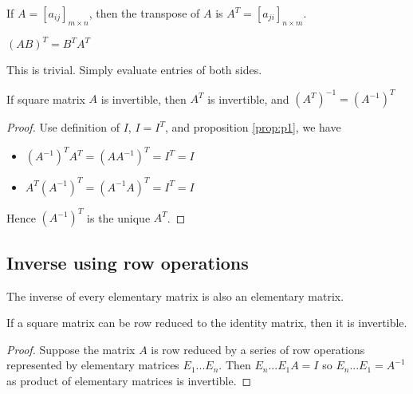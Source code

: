 \documentclass[11pt]{article}
\begin{document}
\begin{definition}
  If \(A=[a_{ij}]_{m\times n}\), then the transpose of \(A\) is \(A^T=[a_{ji}]_{n\times m}\).
\end{definition}

\begin{proposition}[][p1]
  \((AB)^T=B^TA^T\)
\end{proposition}
This is trivial. Simply evaluate entries of both sides. 

\begin{proposition}
  If square matrix \(A\) is invertible, then \(A^{T}\) is invertible, and \((A^T)^{-1}=(A^{-1})^T\)
\end{proposition}
\begin{proof}
  Use definition of \(I\), \(I = I^T\), and proposition \ref{prop:p1}, we have
  \begin{itemize}
    \item \((A^{-1})^TA^T = (AA^{-1})^T = I^T = I\)
    \item \(A^T(A^{-1})^T = (A^{-1}A)^T = I^T = I\)
  \end{itemize}
  Hence \((A^{-1})^T\) is the unique \(A^T\).
\end{proof}

\subsection{Inverse using row operations}
\begin{proposition}
  The inverse of every elementary matrix is also an elementary matrix.
\end{proposition}

\begin{theorem}
  If a square matrix can be row reduced to the identity matrix, then it is invertible. 
\end{theorem}
\begin{proof}
  Suppose the matrix \(A\) is row reduced by a series of row operations represented by elementary matrices \(E_1...E_n\). Then \(E_n...E_1A=I\) so \(E_n...E_1=A^{-1}\) as product of elementary matrices is invertible.
\end{proof}
\end{document}
